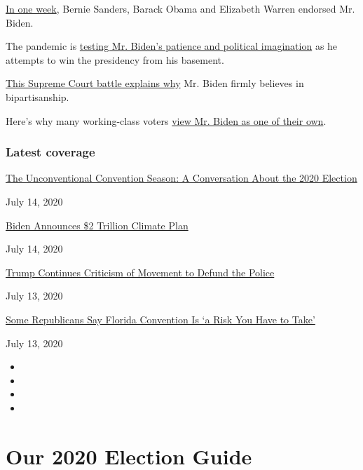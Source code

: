 \href{https://www.nytimes.com/2020/04/15/us/politics/elizabeth-warren-endorse-biden.html?action=click\&module=RelatedLinks\&pgtype=Article}{In
one week}, Bernie Sanders, Barack Obama and Elizabeth Warren endorsed
Mr. Biden.

The pandemic is
\href{https://www.nytimes.com/2020/04/25/us/politics/joe-biden-coronavirus-quarantine.html}{testing
Mr. Biden's patience and political imagination} as he attempts to win
the presidency from his basement.

\href{https://www.nytimes.com/2019/09/07/us/politics/joe-biden-bork-supreme-court.html}{This
Supreme Court battle explains why} Mr. Biden firmly believes in
bipartisanship.

Here's why many working-class voters
\href{https://www.nytimes.com/2019/11/19/us/politics/joe-biden-working-class.html}{view
Mr. Biden as one of their own}.

\hypertarget{latest-coverage}{%
\subsubsection{Latest coverage}\label{latest-coverage}}

\href{https://www.nytimes.com/2020/07/14/us/politics/2020-political-conventions.html}{The
Unconventional Convention Season: A Conversation About the 2020
Election}

July 14, 2020

\href{https://www.nytimes.com/2020/07/14/us/politics/biden-climate-plan.html}{Biden
Announces \$2 Trillion Climate Plan}

July 14, 2020

\href{https://www.nytimes.com/2020/07/13/us/politics/trump-police-reform.html}{Trump
Continues Criticism of Movement to Defund the Police}

July 13, 2020

\href{https://www.nytimes.com/2020/07/13/us/elections/biden-vs-trump.html}{Some
Republicans Say Florida Convention Is `a Risk You Have to Take'}

July 13, 2020

\begin{itemize}
\item
\item
\item
\item
\end{itemize}

\hypertarget{our-2020-election-guide}{%
\section{Our 2020 Election Guide}\label{our-2020-election-guide}}

